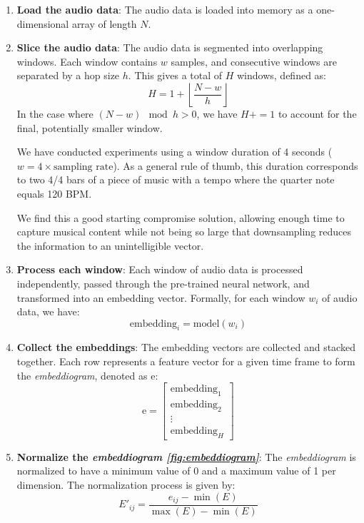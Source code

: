 \begin{enumerate}
\item \textbf{Load the audio data}: The audio data is loaded into memory as a one-dimensional array of length $N$.

\item \textbf{Slice the audio data}: The audio data is segmented into overlapping windows. Each window contains $w$ samples, and consecutive windows are separated by a hop size $h$. This gives a total of $H$ windows, defined as:
\begin{equation}
H = 1 + \left\lfloor \frac{N - w}{h} \right\rfloor
\end{equation}
In the case where $\left( N - w \right) \mod h > 0$, we have $H += 1$ to account for the final, potentially smaller window.

We have conducted experiments using a window duration of 4 seconds (\(w = 4 \times \text{{sampling rate}}\)). As a general rule of thumb, this duration corresponds to two 4/4 bars of a piece of music with a tempo where the quarter note equals 120 BPM.

We find this a good starting compromise solution, allowing enough time to capture musical content while not being so large that downsampling reduces the information to an unintelligible vector.

\item \textbf{Process each window}: Each window of audio data is processed independently, passed through the pre-trained neural network, and transformed into an embedding vector. Formally, for each window $w_i$ of audio data, we have:
\begin{equation}
\text{embedding}_i = \text{model}(w_i)
\end{equation}

\item \textbf{Collect the embeddings}: The embedding vectors are collected and stacked together. Each row represents a feature vector for a given time frame to form the \textit{embeddiogram}, denoted as $\text{e}$:
\begin{equation}
\text{e} = \begin{bmatrix} \text{embedding}_1 \\ \text{embedding}_2 \\ \vdots \\ \text{embedding}_H \end{bmatrix}
\end{equation}

\item \textbf{Normalize the \textit{embeddiogram \ref{fig:embeddiogram}}}: The \textit{embeddiogram} is normalized to have a minimum value of 0 and a maximum value of 1 per dimension. The normalization process is given by:
\begin{equation}
E'_{ij} = \frac{e_{ij} - \min(E)}{\max(E) - \min(E)}
\end{equation}
\end{enumerate}

